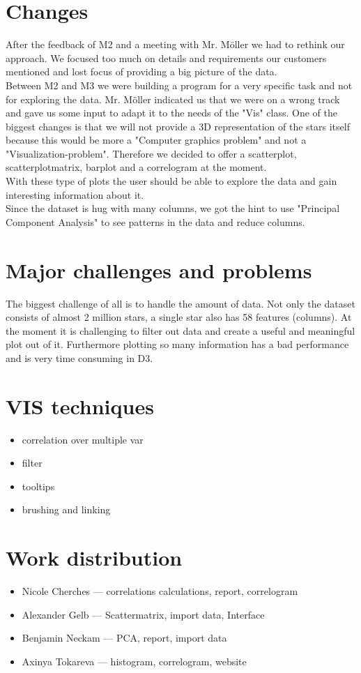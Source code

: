 \documentclass{article}
\begin{document}
\section{Changes}
After the feedback of M2 and a meeting with Mr. Möller we had to rethink our approach. We focused too much on details and requirements our customers mentioned and lost focus of providing a big picture of the data.\\
Between M2 and M3 we were building a program for a very specific task and not for exploring the data. Mr. Möller indicated us that we were on a wrong track and gave us some input to adapt it to the needs of the "Vis" class. One of the biggest changes is that we will not provide a 3D representation of the stars itself because this would be more a "Computer graphics problem" and not a "Visualization-problem". Therefore we decided to offer a scatterplot, scatterplotmatrix, barplot and a correlogram at the moment.\\
With these type of plots the user should be able to explore the data and gain interesting information about it.\\
Since the dataset is hug with many columns, we got the hint to use "Principal Component Analysis" to see patterns in the data and reduce columns.
\section{Major challenges and problems}
The biggest challenge of all is to handle the amount of data. Not only the dataset consists of almost 2 million stars, a single star also has 58 features (columns). At the moment it is challenging to filter out data and create a useful and meaningful plot out of it.  Furthermore plotting so many information has a bad performance and is very time consuming in D3.

\section {VIS techniques}
\begin{itemize}
\item correlation over multiple var
\item filter
\item tooltips
\item brushing and linking
\end{itemize}

\section {Work distribution}
\begin{itemize}
\item Nicole Cherches —  correlations calculations, report, correlogram
\item Alexander Gelb —  Scattermatrix, import data, Interface
\item Benjamin Neckam — PCA, report, import data
\item Axinya Tokareva — histogram, correlogram, website
\end{itemize}
\end{document}
